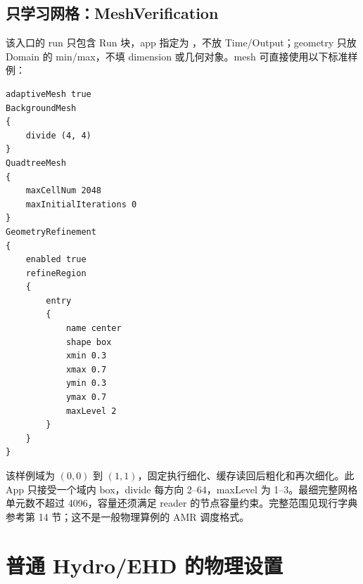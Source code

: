 \documentclass[a4paper,11pt]{article}
\begin{document}
\subsection{只学习网格：MeshVerification}
该入口的 run 只包含 Run 块，app 指定为 ，不放 Time/Output；geometry 只放 Domain 的 min/max，不填 dimension 或几何对象。mesh 可直接使用以下标准样例：
\begin{lstlisting}
adaptiveMesh true
BackgroundMesh
{
    divide (4, 4)
}
QuadtreeMesh
{
    maxCellNum 2048
    maxInitialIterations 0
}
GeometryRefinement
{
    enabled true
    refineRegion
    {
        entry
        {
            name center
            shape box
            xmin 0.3
            xmax 0.7
            ymin 0.3
            ymax 0.7
            maxLevel 2
        }
    }
}
\end{lstlisting}
该样例域为 $(0,0)$ 到 $(1,1)$，固定执行细化、缓存读回后粗化和再次细化。此 App 只接受一个域内 box，divide 每方向 2--64，maxLevel 为 1--3。最细完整网格单元数不超过 4096，容量还须满足 reader 的节点容量约束。完整范围见现行字典参考第 14 节；这不是一般物理算例的 AMR 调度格式。

\section{普通 Hydro/EHD 的物理设置}
\end{document}
